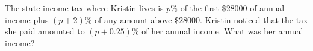 The state income tax where Kristin lives is $p\%$ of the first \$$28000$ of annual income plus $(p+2)\%$ of any amount above \$$28000$. Kristin noticed that the tax she paid amounted to $(p+0.25)\%$ of her annual income. What was her annual income?
